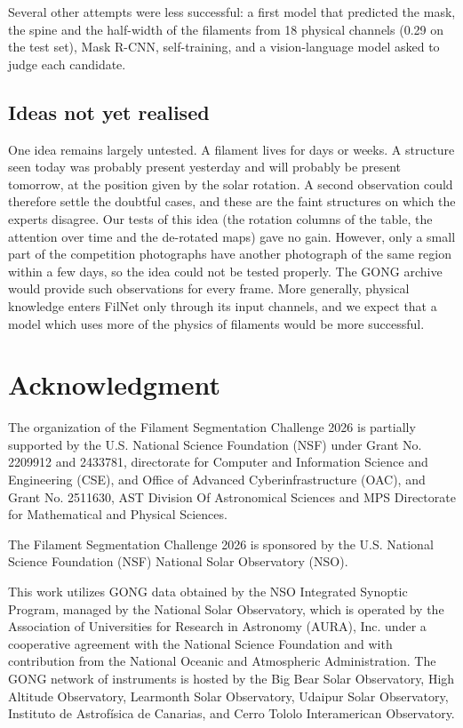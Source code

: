 \documentclass[sigconf]{acmart}
\begin{document}
Several other attempts were less successful: a first model that predicted the mask, the spine and the half-width of the filaments from 18 physical channels (0.29 on the test set), Mask R-CNN, self-training, and a vision-language model asked to judge each candidate.

\subsection{Ideas not yet realised}
One idea remains largely untested. A filament lives for days or weeks. A structure seen today was probably present yesterday and will probably be present tomorrow, at the position given by the solar rotation. A second observation could therefore settle the doubtful cases, and these are the faint structures on which the experts disagree. Our tests of this idea (the rotation columns of the table, the attention over time and the de-rotated maps) gave no gain. However, only a small part of the competition photographs have another photograph of the same region within a few days, so the idea could not be tested properly. The GONG archive would provide such observations for every frame. More generally, physical knowledge enters FilNet only through its input channels, and we expect that a model which uses more of the physics of filaments would be more successful.


\section{Acknowledgment}\label{sec:acknowledgment}
    The organization of the Filament Segmentation Challenge 2026 is partially supported by the U.S. National Science Foundation (NSF) under Grant No. 2209912 and 2433781, directorate for Computer and Information Science and Engineering (CSE), and Office of Advanced Cyberinfrastructure (OAC), and Grant No. 2511630, AST Division Of Astronomical Sciences and MPS Directorate for Mathematical and Physical Sciences.

    The Filament Segmentation Challenge 2026 is sponsored by the U.S. National Science Foundation (NSF) National Solar Observatory (NSO).

    This work utilizes GONG data obtained by the NSO Integrated Synoptic Program, managed by the National Solar Observatory, which is operated by the Association of Universities for Research in Astronomy (AURA), Inc. under a cooperative agreement with the National Science Foundation and with contribution from the National Oceanic and Atmospheric Administration. The GONG network of instruments is hosted by the Big Bear Solar Observatory, High Altitude Observatory, Learmonth Solar Observatory, Udaipur Solar Observatory, Instituto de Astrofísica de Canarias, and Cerro Tololo Interamerican Observatory.



\end{document}

